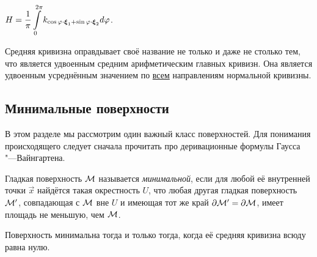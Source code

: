 \begin{corollary}
	$\displaystyle H = \frac{1}{\pi}\int\limits_0^{2\pi}k_{\cos\varphi \cdot \boldsymbol{\xi}_1 + \sin\varphi \cdot \boldsymbol{\xi}_2}d\varphi$.
\end{corollary}

Средняя кривизна оправдывает своё название не только и даже не столько тем, что является удвоенным средним арифметическим главных кривизн. Она является удвоенным усреднённым значением по \underline{всем} направлениям нормальной кривизны.

\subsection{Минимальные поверхности}

В этом разделе мы рассмотрим один важный класс поверхностей. Для понимания происходящего следует сначала прочитать про деривационные формулы Гаусса "---Вайнгартена.

\begin{definition}
	Гладкая поверхность $\mathcal{M}$ называется \textit{минимальной}, если для любой её внутренней точки $\vec{x}$ найдётся такая окрестность $U$, что любая другая гладкая поверхность $\mathcal{M}^\prime$, совпадающая с $\mathcal{M}$ вне $U$ и имеющая тот же край $\partial\mathcal{M}^\prime = \partial\mathcal{M}$, имеет площадь не меньшую, чем $\mathcal{M}$.
\end{definition}

%

\begin{theorem}
	Поверхность минимальна тогда и только тогда, когда её средняя кривизна всюду равна нулю.
\end{theorem}

